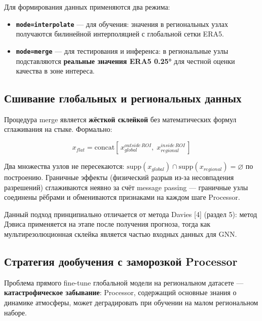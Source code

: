 \documentclass[14pt,a4paper]{extarticle}
\numberwithin{table}{section}
\numberwithin{figure}{section}
\numberwithin{equation}{section}
\providecommand{\tightlist}{%
  \setlength{\itemsep}{0pt}\setlength{\parskip}{0pt}}
\begin{document}
Для формирования данных применяются два режима:

\begin{itemize}
\tightlist
\item
  \textbf{\texttt{mode=interpolate}} --- для обучения: значения в
  региональных узлах получаются билинейной интерполяцией с глобальной
  сетки ERA5.
\item
  \textbf{\texttt{mode=merge}} --- для тестирования и инференса: в
  региональные узлы подставляются \textbf{реальные значения ERA5 0.25°}
  для честной оценки качества в зоне интереса.
\end{itemize}

\subsection{Сшивание глобальных и региональных данных}\label{ux441ux448ux438ux432ux430ux43dux438ux435-ux433ux43bux43eux431ux430ux43bux44cux43dux44bux445-ux438-ux440ux435ux433ux438ux43eux43dux430ux43bux44cux43dux44bux445-ux434ux430ux43dux43dux44bux445}

Процедура merge является \textbf{жёсткой склейкой} без математических
формул сглаживания на стыке. Формально:

\[x_{flat} = \text{concat}\!\left[\, x_{global}^{outside\,ROI}, \; x_{regional}^{inside\,ROI} \,\right]\]

Два множества узлов не пересекаются:
\(\text{supp}(x_{global}) \cap \text{supp}(x_{regional}) = \varnothing\)
по построению. Граничные эффекты (физический разрыв из-за несовпадения
разрешений) сглаживаются неявно за счёт message passing --- граничные
узлы соединены рёбрами и обмениваются признаками на каждом шаге
Processor.

Данный подход принципиально отличается от метода Davies {[}4{]} (раздел
5): метод Дэвиса применяется на этапе после получения прогноза, тогда
как мультирезолюционная склейка является частью входных данных для GNN.

\subsection{Стратегия дообучения с заморозкой Processor}\label{ux441ux442ux440ux430ux442ux435ux433ux438ux44f-ux434ux43eux43eux431ux443ux447ux435ux43dux438ux44f-ux441-ux437ux430ux43cux43eux440ux43eux437ux43aux43eux439-processor}

Проблема прямого fine-tune глобальной модели на региональном датасете
--- \textbf{катастрофическое забывание}: Processor, содержащий основные
знания о динамике атмосферы, может деградировать при обучении на малом
региональном наборе.
\end{document}
